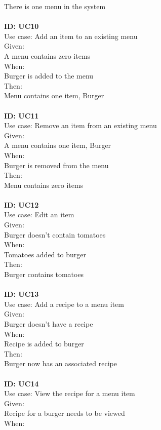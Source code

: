 There is one menu in the system\\
\\
\textbf{ID: UC10\\}
Use case: Add an item to an existing menu\\
Given: \\
A menu contains zero items\\
When: \\
Burger is added to the menu\\
Then:\\
Menu contains one item, Burger\\
\\
\textbf{ID: UC11\\}
Use case: Remove an item from an existing menu\\
Given: \\
A menu contains one item, Burger\\
When: \\
Burger is removed from the menu\\
Then:\\
Menu contains zero items\\
\\
\textbf{ID: UC12\\}
Use case: Edit an item\\
Given: \\
Burger doesn't contain tomatoes\\
When: \\
Tomatoes added to burger\\
Then:\\
Burger contains tomatoes\\
\\
\textbf{ID: UC13\\}
Use case: Add a recipe to a menu item\\
Given: \\
Burger doesn't have a recipe\\
When: \\
Recipe is added to burger\\
Then:\\
Burger now has an associated recipe\\
\\
\textbf{ID: UC14\\}
Use case: View the recipe for a menu item\\
Given: \\
Recipe for a burger needs to be viewed\\
When: \\
